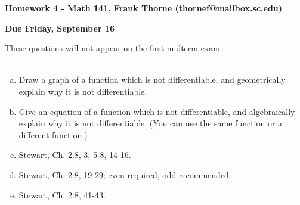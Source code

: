 \documentclass[12pt]{article}
\begin{document}
\setlength{\topmargin}{-2mm}





\begin{center}{\bf Homework 4 - Math 141, Frank Thorne (thornef@mailbox.sc.edu)}
\end{center}
\begin{center}
{\bf Due Friday, September 16}
\end{center}

These questions will not appear on the first midterm exam. 
\\
\\
\begin{enumerate}[(a)]
\item
Draw a graph of a function which is not differentiable, and geometrically explain why it is not differentiable.

\item
Give an equation of a function which is not differentiable, and algebraically explain why it is not differentiable.
(You can use the same function or a different function.)

\item
Stewart, Ch. 2.8, 3, 5-8, 14-16.
\item
Stewart, Ch. 2.8, 19-29; even required, odd recommended.
\item
Stewart, Ch. 2.8, 41-43.

\end{enumerate}
\end{document}
